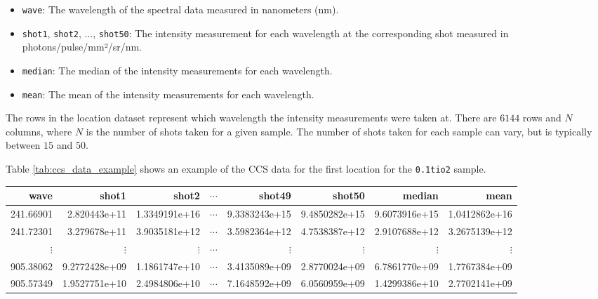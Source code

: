\begin{itemize}
    \item \texttt{wave}: The wavelength of the spectral data measured in nanometers (nm).
    \item \texttt{shot1}, \texttt{shot2}, ..., \texttt{shot50}: The intensity measurement for each wavelength at the corresponding shot measured in photons/pulse/mm²/sr/nm.
    \item \texttt{median}: The median of the intensity measurements for each wavelength.
    \item \texttt{mean}: The mean of the intensity measurements for each wavelength.
\end{itemize}

The rows in the location dataset represent which wavelength the intensity measurements were taken at.
There are $6144$ rows and $N$ columns, where $N$ is the number of shots taken for a given sample.
The number of shots taken for each sample can vary, but is typically between $15$ and $50$.

Table \ref{tab:ccs_data_example} shows an example of the CCS data for the first location for the \texttt{0.1tio2} sample.

\begin{table*}[ht]
\centering
\begin{tabular}{rrrrrrrr}
\toprule
     wave &        shot1 &      shot2 &      $\cdots$ &       shot49 &       shot50 & median & mean \\
\midrule
241.66901 & 2.820443e+11 & 1.3349191e+16 & $\cdots$ & 9.3383243e+15 & 9.4850282e+15 & 9.6073916e+15 & 1.0412862e+16 \\
241.72301 & 3.279678e+11 & 3.9035181e+12 & $\cdots$ & 3.5982364e+12 & 4.7538387e+12 & 2.9107688e+12 & 3.2675139e+12 \\
$\vdots$  & $\vdots$     & $\vdots$ & $\cdots$ & $\vdots$ & $\vdots$ & $\vdots$ & $\vdots$ \\
905.38062 & 9.2772428e+09 & 1.1861747e+10 & $\cdots$ & 3.4135089e+09 & 2.8770024e+09 & 6.7861770e+09 & 1.7767384e+09 \\
905.57349 & 1.9527751e+10 & 2.4984806e+10 & $\cdots$ & 7.1648592e+09 & 6.0560959e+09 & 1.4299386e+10 & 2.7702141e+09 \\
\bottomrule
\end{tabular}
\caption{Example of CCS data for the first sample in the \texttt{0.1tio2} directory.}
\label{tab:ccs_data_example}
\end{table*}

